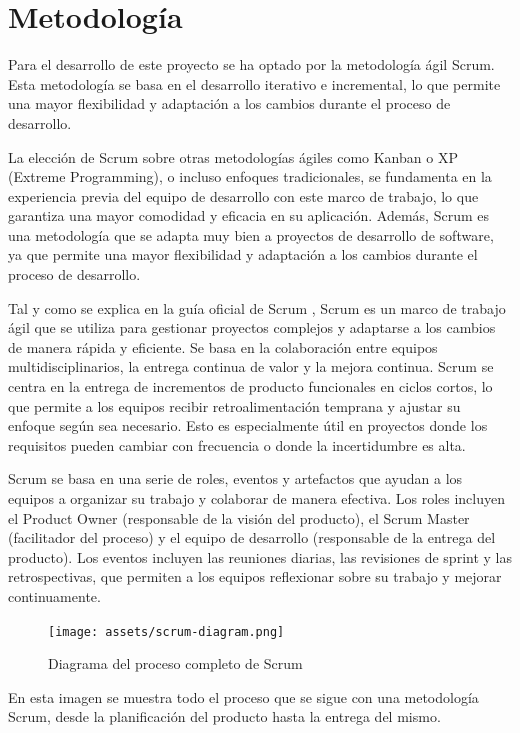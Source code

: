 \section{Metodología}
\label{sec:metodologia}

Para el desarrollo de este proyecto se ha optado por la metodología ágil Scrum. Esta metodología se basa en el desarrollo iterativo e incremental, lo que permite una mayor flexibilidad y adaptación a los cambios durante el proceso de desarrollo.

La elección de Scrum sobre otras metodologías ágiles como Kanban o XP (Extreme Programming), o incluso enfoques tradicionales, se fundamenta en la experiencia previa del equipo de desarrollo con este marco de trabajo, lo que garantiza una mayor comodidad y eficacia en su aplicación.
Además, Scrum es una metodología que se adapta muy bien a proyectos de desarrollo de software, ya que permite una mayor flexibilidad y adaptación a los cambios durante el proceso de desarrollo.

Tal y como se explica en la guía oficial de Scrum \parencite{scrum-guide}, Scrum es un marco de trabajo ágil que se utiliza para gestionar proyectos complejos y adaptarse a los cambios de manera rápida y eficiente. Se basa en la colaboración entre equipos multidisciplinarios, la entrega continua de valor y la mejora continua.
Scrum se centra en la entrega de incrementos de producto funcionales en ciclos cortos, lo que permite a los equipos recibir retroalimentación temprana y ajustar su enfoque según sea necesario. Esto es especialmente útil en proyectos donde los requisitos pueden cambiar con frecuencia o donde la incertidumbre es alta.

Scrum se basa en una serie de roles, eventos y artefactos que ayudan a los equipos a organizar su trabajo y colaborar de manera efectiva. Los roles incluyen el Product Owner (responsable de la visión del producto), el Scrum Master (facilitador del proceso) y el equipo de desarrollo (responsable de la entrega del producto). Los eventos incluyen las reuniones diarias, las revisiones de sprint y las retrospectivas, que permiten a los equipos reflexionar sobre su trabajo y mejorar continuamente.

\begin{figure}[H]
  \centering
  \texttt{[image: assets/scrum-diagram.png]}
  \caption{Diagrama del proceso completo de Scrum \parencite{scrum-diagram}}
  \label{fig:scrum-diagram}
\end{figure}

En esta imagen se muestra todo el proceso que se sigue con una metodología Scrum, desde la planificación del producto hasta la entrega del mismo.

